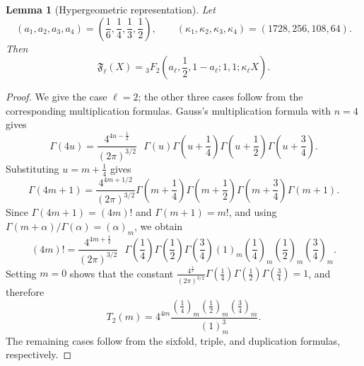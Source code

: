 \documentclass[11pt,a4paper]{amsart} %
\newtheorem{lemma}[theorem]{Lemma}
\theoremstyle{definition}
\begin{document}
\begin{lemma}[Hypergeometric representation]\label{lem:hyp}
Let
\[
(a_1,a_2,a_3,a_4)
=\left(\frac16,\frac14,\frac13,\frac12\right),
\qquad
(\kappa_1,\kappa_2,\kappa_3,\kappa_4)
=(1728,256,108,64).
\]
Then
\[
{\mathfrak F}_\ell(X)
={}_3F_2\!\left(a_\ell,\frac12,1-a_\ell;1,1;\kappa_\ell X\right).
\]
\end{lemma}
\begin{proof}
We give the case $\ell=2$; the other three cases follow from the corresponding multiplication formulas.  Gauss's multiplication formula with $n=4$ gives
\[ \Gamma (4 u) = \frac{4^{4 u - \frac{1}{2}}}{(2 \pi)^{3 / 2}} \text{ }
   \Gamma (u) \Gamma  \left( u + \frac{1}{4} \right) \Gamma  \left( u + \frac{1}{2} \right) \Gamma \left( u + \frac{3}{4}
   \right) . \]
Substituting $u=m+\frac14$ gives
\[
\Gamma(4m+1)=\frac{4^{4m+1/2}}{(2\pi)^{3/2}}
\Gamma\left(m+\frac14\right)
\Gamma\left(m+\frac12\right)
\Gamma\left(m+\frac34\right)
\Gamma(m+1).
\]
Since $\Gamma (4 m + 1) = (4 m) !$ and $\Gamma (m + 1) = m!$, and using $\Gamma (m + \alpha) / \Gamma (\alpha) = (\alpha)_m$, we obtain
\[ (4 m) ! = \frac{4^{4 m + \frac{1}{2}}}{(2 \pi)^{3 / 2}} \text{ } \Gamma
    \left( \frac{1}{4} \right) \Gamma  \left( \frac{1}{2}
   \right) \Gamma  \left( \frac{3}{4} \right) (1)_m  \left(
   \frac{1}{4} \right)_m \left( \frac{1}{2} \right)_m \left( \frac{3}{4}
   \right)_m . \]
Setting $m=0$ shows that the constant $\frac{4^{\frac{1}{2}}}{(2 \pi)^{3 / 2}}
\Gamma \left( \frac{1}{4} \right) \Gamma \left( \frac{1}{2} \right) \Gamma
\left( \frac{3}{4} \right) = 1$, and therefore
\[ T_2(m) = 4^{4 m} \frac{\left( \frac{1}{4}
   \right)_m \left( \frac{1}{2} \right)_m \left( \frac{3}{4}
   \right)_m}{(1)_m^3} . \] The remaining cases follow from the sixfold, triple, and duplication formulas, respectively.
\end{proof}
\end{document}
